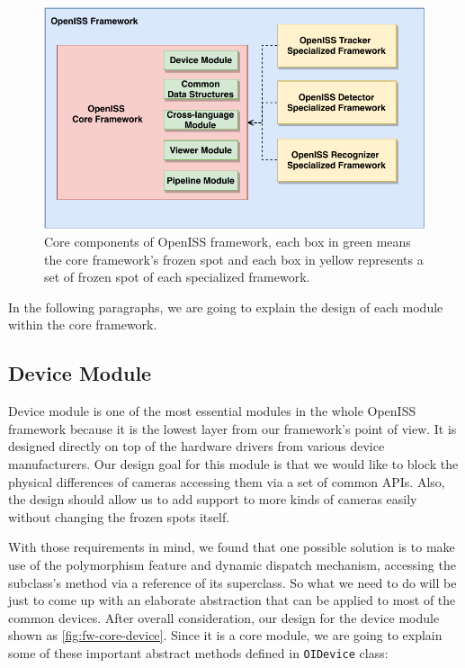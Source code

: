 \begin{figure}
    \includegraphics[width=\linewidth]{figures/framework_core_module.pdf}
    \caption[Core components of OpenISS framework]
    {Core components of OpenISS framework, each box in green means the core
    framework's frozen spot and each box in yellow represents a set of frozen
    spot of each specialized framework.}
    \label{fig:fw-core-module}
\end{figure}

In the following paragraphs, we are going to explain the design of each module 
within the core framework.

\subsection{Device Module}
\label{sec:fw-design-core-device}

Device module is one of the most essential modules in the whole OpenISS
framework because it is the lowest layer from our framework's point of view. It
is designed directly on top of the hardware drivers from various device
manufacturers.
Our design goal for this module is that we would like to block the physical
differences of cameras accessing them via a set of common APIs. Also, the
design should allow us to add support to more kinds of cameras easily without
changing the frozen spots itself.

With those requirements in mind, we found that one possible solution is to make
use of the polymorphism feature and dynamic dispatch mechanism, accessing the
subclass's method via a reference of its superclass. So what we need to do
will be just to come up with an elaborate abstraction that can be applied to
most of the common devices. After overall consideration, our design for the device
module shown as \autoref{fig:fw-core-device}. Since it is a core module, we are
going to explain some of these important abstract methods defined
in \texttt{OIDevice} class:

